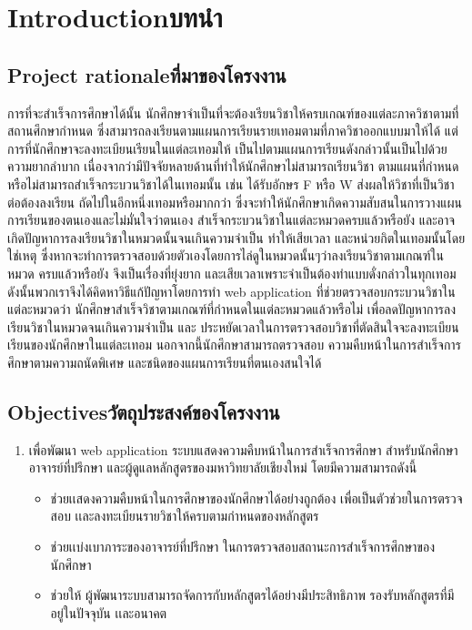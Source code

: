 \chapter{\ifenglish Introduction\else บทนำ\fi}

\section{\ifenglish Project rationale\else ที่มาของโครงงาน\fi}
การที่จะสําเร็จการศึกษาได้นั้น นักศึกษาจําเป็นที่จะต้องเรียนวิชาให้ครบเกณฑ์ของแต่ละภาควิชาตามที่สถานศึกษากําหนด
ซึ่งสามารถลงเรียนตามแผนการเรียนรายเทอมตามที่ภาควิชาออกแบบมาให้ได้ แต่การที่นักศึกษาจะลงทะเบียนเรียนในแต่ละเทอมให้
เป็นไปตามแผนการเรียนดังกล่าวนั้นเป็นไปด้วยความยากลําบาก เนื่องจากว่ามีปัจจัยหลายด้านที่ทําให้นักศึกษาไม่สามารถเรียนวิชา
ตามแผนที่กําหนดหรือไม่สามารถสําเร็จกระบวนวิชาได้ในเทอมนั้น เช่น ได้รับอักษร F หรือ W ส่งผลให้วิชาที่เป็นวิชาต่อต้องลงเรียน
ถัดไปในอีกหนึ่งเทอมหรือมากกว่า ซึ่งจะทําให้นักศึกษาเกิดความสับสนในการวางแผนการเรียนของตนเองและไม่มั่นใจว่าตนเอง
สําเร็จกระบวนวิชาในแต่ละหมวดครบแล้วหรือยัง และอาจเกิดปัญหาการลงเรียนวิชาในหมวดนั้นจนเกินความจําเป็น ทําให้เสียเวลา
และหน่วยกิตในเทอมนั้นโดยใช่เหตุ ซึ่งหากจะทําการตรวจสอบด้วยตัวเองโดยการไล่ดูในหมวดนั้นๆว่าลงเรียนวิชาตามเกณฑ์ในหมวด
ครบแล้วหรือยัง จึงเป็นเรื่องที่ยุ่งยาก และเสียเวลาเพราะจําเป็นต้องทําแบบดั่งกล่าวในทุกเทอม
ดังนั้นพวกเราจึงได้คิดหาวิธีแก้ปัญหาโดยการทํา web application ที่ช่วยตรวจสอบกระบวนวิชาในแต่ละหมวดว่า
นักศึกษาสําเร็จวิชาตามเกณฑ์ที่กําหนดในแต่ละหมวดแล้วหรือไม่ เพื่อลดปัญหาการลงเรียนวิชาในหมวดจนเกินความจําเป็น และ
ประหยัดเวลาในการตรวจสอบวิชาที่ตัดสินใจจะลงทะเบียนเรียนของนักศึกษาในแต่ละเทอม นอกจากนี้นักศึกษาสามารถตรวจสอบ
ความคืบหน้าในการสําเร็จการศึกษาตามความถนัดพิเศษ และชนิดของแผนการเรียนที่ตนเองสนใจได้

\section{\ifenglish Objectives\else วัตถุประสงค์ของโครงงาน\fi}
\begin{enumerate}
    \item เพื่อพัฒนา web application ระบบแสดงความคืบหน้าในการสำเร็จการศึกษา สําหรับนักศึกษา อาจารย์ที่ปรึกษา 
    และผู้ดูแลหลักสูตรของมหาวิทยาลัยเชียงใหม่ โดยมีความสามารถดังนี้
\begin{itemize}
    \item ช่วยเเสดงความคืบหน้าในการศึกษาของนักศึกษาได้อย่างถูกต้อง เพื่อเป็นตัวช่วยในการตรวจสอบ เเละลงทะเบียนรายวิชาให้ครบตามกําหนดของหลักสูตร
    \item ช่วยเเบ่งเบาภาระของอาจารย์ที่ปรึกษา ในการตรวจสอบสถานะการสําเร็จการศึกษาของนักศึกษา
    \item ช่วยให้ ผู้พัฒนาระบบสามารถจัดการกับหลักสูตรได้อย่างมีประสิทธิภาพ รองรับหลักสูตรที่มีอยู่ในปัจจุบัน เเละอนาคต
\end{itemize}  
\end{enumerate}

